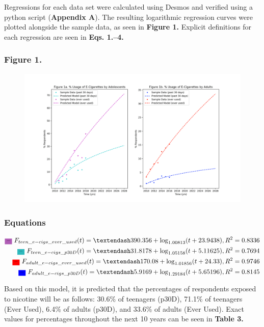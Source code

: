 Regressions for each data set were calculated using Desmos and verified using a python script (\textbf{Appendix A}). The resulting logarithmic regression curves were plotted alongside the sample data, as seen in \textbf{Figure 1.} Explicit definitions for each regression are seen in \textbf{Eqs. 1.–4.}

\subsubsection*{Figure 1.}
\begin{figure}[H]
    \centering \includegraphics*[scale=1]{assets/math-modeling-figure-1.png}
\end{figure}

\subsubsection*{Equations}
\begin{align}
    \text{\colorbox{Orchid}{--} } F_{teen\_e-cigs\_ever\_used}(t) = –390.356 + \log_{1.00813}(t + 23.9438), R^2 = 0.8336 \\
    \text{\colorbox{Aquamarine}{--} } F_{teen\_e-cigs\_p30D}(t) = –31.8178 + \log_{1.05158}(t + 5.11625), R^2 = 0.7694 \\
    \text{\colorbox{red}{--} } F_{adult\_e-cigs\_ever\_used}(t) = –170.08+ \log_{1.01856}(t + 24.33), R^2 = 0.9746 \\
    \text{\colorbox{blue}{--} } F_{adult\_e-cigs\_p30D}(t) = –5.9169 + \log_{1.29184}(t + 5.65196), R^2 = 0.8145
\end{align}

Based on this model, it is predicted that the percentages of respondents exposed to nicotine will be as follows: 30.6\% of teenagers (p30D), 71.1\% of teenagers (Ever Used), 6.4\% of adults (p30D), and 33.6\% of adults (Ever Used). Exact values for percentages throughout the next 10 years can be seen in \textbf{Table 3.}

